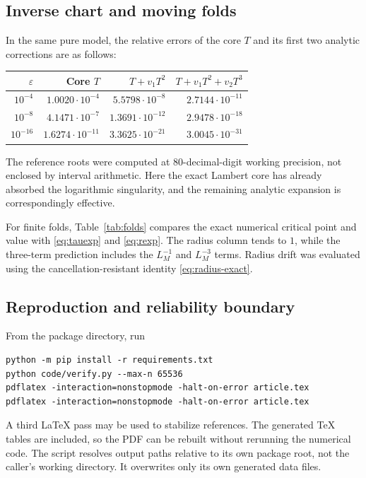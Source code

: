 \documentclass[11pt,a4paper]{article}
\numberwithin{equation}{section}
\theoremstyle{definition}
\theoremstyle{remark}
\newcommand{\eps}{\varepsilon}
\begin{document}
\subsection{Inverse chart and moving folds}
In the same pure model, the relative errors of the core $T$ and its
first two analytic corrections are as follows:
\begin{center}
\small
\begin{tabular}{rrrr}
\toprule
$\eps$ & Core $T$ & $T+v_1T^2$ & $T+v_1T^2+v_2T^3$\\
\midrule
$10^{-4}$ & $1.0020\cdot10^{-4}$ & $5.5798\cdot10^{-8}$ & $2.7144\cdot10^{-11}$\\
$10^{-8}$ & $4.1471\cdot10^{-7}$ & $1.3691\cdot10^{-12}$ & $2.9478\cdot10^{-18}$\\
$10^{-16}$ & $1.6274\cdot10^{-11}$ & $3.3625\cdot10^{-21}$ & $3.0045\cdot10^{-31}$\\
\bottomrule
\end{tabular}
\end{center}
The reference roots were computed at 80-decimal-digit working precision,
not enclosed by interval arithmetic. Here the exact Lambert core has
already absorbed the logarithmic singularity, and the remaining
analytic expansion is correspondingly effective.

For finite folds, Table~\ref{tab:folds} compares the exact numerical
critical point and value with \eqref{eq:tauexp} and \eqref{eq:rexp}.
The radius column tends to $1$, while the three-term prediction includes
the $L_M^{-1}$ and $L_M^{-3}$ terms. Radius drift was evaluated using
the cancellation-resistant identity \eqref{eq:radius-exact}.
\begin{table}[htbp]
\centering\small

\caption{Finite-action critical-point and critical-value drift. In this
pure model $L_M=H_M$.}
\label{tab:folds}
\end{table}

\subsection{Reproduction and reliability boundary}
From the package directory, run
\begin{verbatim}
python -m pip install -r requirements.txt
python code/verify.py --max-n 65536
pdflatex -interaction=nonstopmode -halt-on-error article.tex
pdflatex -interaction=nonstopmode -halt-on-error article.tex
\end{verbatim}
A third LaTeX pass may be used to stabilize references. The generated
TeX tables are included, so the PDF can be rebuilt without rerunning the
numerical code. The script resolves output paths relative to its own
package root, not the caller's working directory. It overwrites only
its own generated data files.
\end{document}
